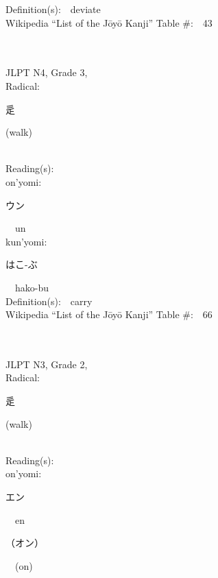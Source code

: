 \begin{multicols}{2}
Definition(s):\ \ deviate \\
Wikipedia ``List of the J\=oy\=o Kanji'' Table \#:\ \ 43 \\
\ \ \\
{\fontsize{34pt}{40pt}  }\ \ \\  %
{JLPT N4, Grade 3, \\Radical:\ \ {\begin{CJK}{UTF8}{min} 辵 \end{CJK}} (walk) } \\
Reading(s):\ \ \\
{\hspace*{1em}}on'yomi:\ \ \\
{\hspace*{2em}}{\begin{CJK}{UTF8}{min} ウン \end{CJK}}\ \ un\ \ \\
{\hspace*{1em}}kun'yomi:\ \ \\
{\hspace*{2em}}{\begin{CJK}{UTF8}{min} はこ-ぶ \end{CJK}}\ \ hako-bu\ \ \\
Definition(s):\ \ carry \\
Wikipedia ``List of the J\=oy\=o Kanji'' Table \#:\ \ 66 \\
\ \ \\
{\fontsize{34pt}{40pt}  }\ \ \\  %
{JLPT N3, Grade 2, \\Radical:\ \ {\begin{CJK}{UTF8}{min} 辵 \end{CJK}} (walk) } \\
Reading(s):\ \ \\
{\hspace*{1em}}on'yomi:\ \ \\
{\hspace*{2em}}{\begin{CJK}{UTF8}{min} エン \end{CJK}}\ \ en\ \ \\
{\hspace*{2em}}{\begin{CJK}{UTF8}{min} （オン） \end{CJK}}\ \ (on)\ \ \\

\end{multicols}
